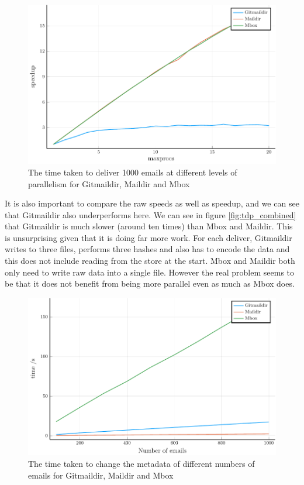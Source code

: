 \begin{figure}[h]
    \centering
    \includegraphics{figs/tdpp_speedup_combined}
    \caption{The time taken to deliver 1000 emails at different levels of parallelism for Gitmaildir, Maildir and Mbox}
    \label{fig:tdpp_speedup_combined}
\end{figure}

It is also important to compare the raw speeds as well as speedup, and we can see that Gitmaildir also underperforms here. We can see in figure \ref{fig:tdp_combined} that Gitmaildir is much slower (around ten times) than Mbox and Maildir. This is unsurprising given that it is doing far more work. For each deliver, Gitmaildir writes to three files, performs three hashes and also has to encode the data and this does not include reading from the store at the start. Mbox and Maildir both only need to write raw data into a single file. However the real problem seems to be that it does not benefit from being more parallel even as much as Mbox does.

\begin{figure}[h]
    \centering
    \includegraphics{figs/tmp_combined}
    \caption{The time taken to change the metadata of different numbers of emails for Gitmaildir, Maildir and Mbox}
    \label{fig:tmp_combined}
\end{figure}

